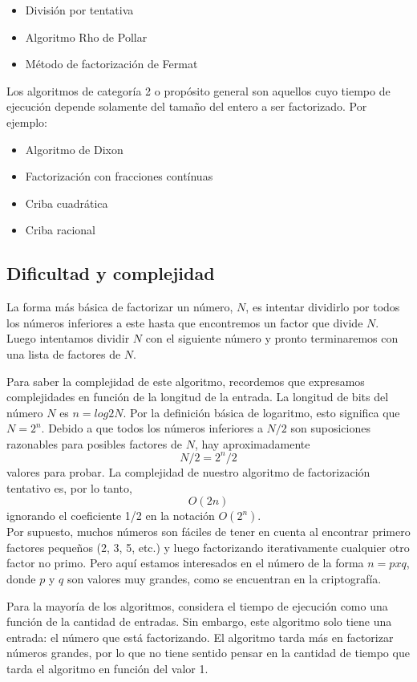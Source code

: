 \documentclass{article}
\begin{document}
\begin{itemize}
    \item División por tentativa
    \item Algoritmo Rho de Pollar
    \item Método de factorización de Fermat
\end{itemize}

Los algoritmos de categoría 2 o propósito general son aquellos cuyo tiempo de
ejecución depende solamente del tamaño del entero a ser factorizado. Por ejemplo:

\begin{itemize}
    \item Algoritmo de Dixon
    \item Factorización con fracciones contínuas
    \item Criba cuadrática
    \item Criba racional
\end{itemize}

\subsection{Dificultad y complejidad}


La forma más básica de factorizar un número, $N$, es intentar dividirlo por
todos los números inferiores a este hasta que encontremos un factor que divide
$N$. Luego intentamos dividir $N$ con el siguiente número y pronto terminaremos
con una lista de factores de $N$.

Para saber la complejidad de este algoritmo, recordemos que expresamos
complejidades en función de la longitud de la entrada. La longitud de bits del
número $N$ es $n= log2 N$. Por la definición básica de logaritmo, esto
significa que $N = 2^n$. Debido a que todos los números inferiores a $N/2$ son
suposiciones razonables para posibles factores de $N$, hay aproximadamente $$N/2
= 2^n/2$$ valores para probar. La complejidad de nuestro algoritmo de
factorización tentativo es, por lo tanto, $$ O(2n) $$ ignorando el coeficiente
1/2 en la notación $ O(2^n)$. \\

Por supuesto, muchos números son fáciles de tener en cuenta al encontrar primero
factores pequeños (2, 3, 5, etc.) y luego factorizando iterativamente cualquier
otro factor no primo. Pero aquí estamos interesados en el número de la forma $n
= p x q$, donde $p$ y $q$ son valores muy grandes, como se encuentran en la
criptografía.

Para la mayoría de los algoritmos, considera el tiempo de ejecución como una
función de la cantidad de entradas. Sin embargo, este algoritmo solo tiene una
entrada: el número que está factorizando. El algoritmo tarda más en factorizar
números grandes, por lo que no tiene sentido pensar en la cantidad de tiempo que
tarda el algoritmo en función del valor 1. 
\end{document}
